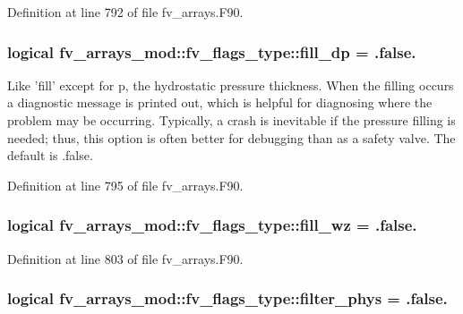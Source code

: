Definition at line 792 of file fv\-\_\-arrays.\-F90.

\subsubsection[{fill\-\_\-dp}]{\setlength{\rightskip}{0pt plus 5cm}logical fv\-\_\-arrays\-\_\-mod\-::fv\-\_\-flags\-\_\-type\-::fill\-\_\-dp = .false.}\label{structfv__arrays__mod_1_1fv__flags__type_a900830b0b645ed0a0c9d62907158432d}


Like 'fill' except for p, the hydrostatic pressure thickness. When the filling occurs a diagnostic message is printed out, which is helpful for diagnosing where the problem may be occurring. Typically, a crash is inevitable if the pressure filling is needed; thus, this option is often better for debugging than as a safety valve. The default is .false. 



Definition at line 795 of file fv\-\_\-arrays.\-F90.

\subsubsection[{fill\-\_\-wz}]{\setlength{\rightskip}{0pt plus 5cm}logical fv\-\_\-arrays\-\_\-mod\-::fv\-\_\-flags\-\_\-type\-::fill\-\_\-wz = .false.}\label{structfv__arrays__mod_1_1fv__flags__type_ad68d757243a380398edfa7ed880d039f}


Definition at line 803 of file fv\-\_\-arrays.\-F90.

\subsubsection[{filter\-\_\-phys}]{\setlength{\rightskip}{0pt plus 5cm}logical fv\-\_\-arrays\-\_\-mod\-::fv\-\_\-flags\-\_\-type\-::filter\-\_\-phys = .false.}\label{structfv__arrays__mod_1_1fv__flags__type_aa08a96d7def8d7f16a3f9b76948c6006}


